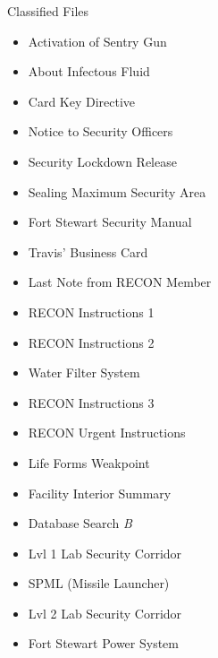 \begin{classified}{Classified Files}
    \begin{itemize}
        \item Activation of Sentry Gun
        \item About Infectous Fluid
        \item Card Key Directive
        \item Notice to Security Officers
        \item Security Lockdown Release
        \item Sealing Maximum Security Area
        \item Fort Stewart Security Manual
        \item Travis' Business Card
        \item Last Note from RECON Member
        \item RECON Instructions 1
        \item RECON Instructions 2
        \item Water Filter System
        \item RECON Instructions 3
        \item RECON Urgent Instructions
        \item Life Forms Weakpoint
        \item Facility Interior Summary
        \item Database Search \emph{B}
        \item Lvl 1 Lab Security Corridor
        \item SPML (Missile Launcher)
        \item Lvl 2 Lab Security Corridor
        \item Fort Stewart Power System
    \end{itemize}
\end{classified}
